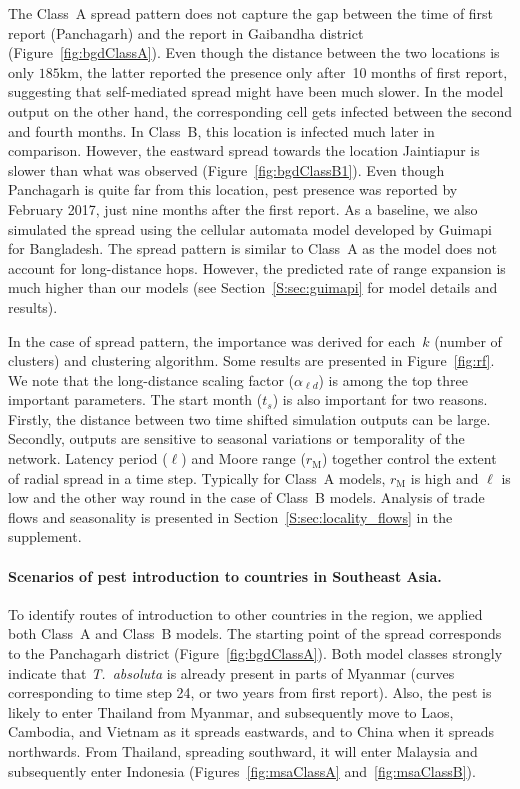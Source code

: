 \documentclass[11pt]{article}
\newcommand{\tuta}{\emph{T.~absoluta}}
\newcommand{\ald}{\alpha_{\ell d}}
\newcommand{\mooreRange}{r_\mathrm{M}}
\theoremstyle{definition}
\begin{document}
The Class~A spread pattern does not capture the gap between the time of first
report (Panchagarh) and the report in Gaibandha district
(Figure~\ref{fig:bgdClassA}). Even though the distance between the two
locations is only $185$km, the latter reported the presence only after~10
months of first report, suggesting that self-mediated spread might have been
much slower. In the model output on the other hand, the corresponding cell
gets infected between the second and fourth months.  In Class~B, this
location is infected much later in comparison. However, the eastward spread
towards the location Jaintiapur is slower than what was observed
(Figure~\ref{fig:bgdClassB1}). Even though Panchagarh is quite far from
this location, pest presence was reported by February 2017, just nine
months after the first report.  As a baseline, we also simulated the spread
using the cellular automata model developed by
Guimapi~\cite{guimapi2016modeling} for Bangladesh. The spread pattern is
similar to Class~A as the model does not account for long-distance hops.
However, the predicted rate of range expansion is much higher than our
models (see Section~\ref{S:sec:guimapi} for model details and results).

In the case of spread pattern, the
importance was derived for each~$k$ (number of clusters) and clustering
algorithm. Some results are presented in Figure~\ref{fig:rf}. We note that
the long-distance scaling factor ($\ald$) is among the top three important
parameters. The start month ($t_s$) is also important for two reasons.
Firstly, the distance between two time shifted simulation outputs can be
large. Secondly, outputs are sensitive to seasonal variations or
temporality of the network.  Latency period ($\ell$) and Moore range
($\mooreRange$) together control the extent of radial spread in a time
step. Typically for Class~A models, $\mooreRange$ is high and $\ell$ is
low and the other way round in the case of Class~B models. Analysis of
trade flows and seasonality is presented in
Section~\ref{S:sec:locality_flows}
in the supplement.

\paragraph{Scenarios of pest introduction to countries in Southeast Asia.}
To identify routes of introduction to other countries in the region, we
applied both Class~A and Class~B models. The starting point of the spread
corresponds to the Panchagarh district (Figure~\ref{fig:bgdClassA}). Both model
classes strongly indicate that \tuta{} is already present in parts of
Myanmar (curves corresponding to time step 24, or two years from first
report). Also, the pest is likely to enter Thailand from Myanmar, and
subsequently move to Laos, Cambodia, and Vietnam as it spreads eastwards, and
to China when it spreads northwards. From Thailand, spreading southward, it
will enter Malaysia and subsequently enter Indonesia
(Figures~\ref{fig:msaClassA} and~\ref{fig:msaClassB}).
\end{document}
